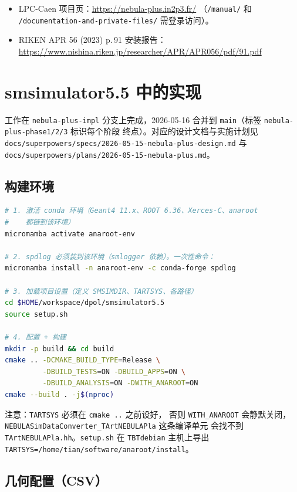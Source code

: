 \documentclass[a4paper,11pt]{ctexart}
\begin{document}
\begin{itemize}
  \item LPC-Caen 项目页：\url{https://nebula-plus.in2p3.fr/}
        （\texttt{/manual/} 和 \texttt{/documentation-and-private-files/}
        需登录访问）。
  \item RIKEN APR 56 (2023) p.\,91 安装报告：
        \url{https://www.nishina.riken.jp/researcher/APR/APR056/pdf/91.pdf}
\end{itemize}

\section{smsimulator5.5 中的实现}
\label{sec:impl}

工作在 \texttt{nebula-plus-impl} 分支上完成，2026-05-16 合并到
\texttt{main}（标签 \texttt{nebula-plus-phase1/2/3} 标识每个阶段
终点）。对应的设计文档与实施计划见
\texttt{docs/superpowers/specs/2026-05-15-nebula-plus-design.md}
与
\texttt{docs/superpowers/plans/2026-05-15-nebula-plus.md}。

\subsection{构建环境}

\begin{lstlisting}[language=bash]
# 1. 激活 conda 环境（Geant4 11.x、ROOT 6.36、Xerces-C、anaroot
#    都链到该环境）
micromamba activate anaroot-env

# 2. spdlog 必须装到该环境（smlogger 依赖）。一次性命令：
micromamba install -n anaroot-env -c conda-forge spdlog

# 3. 加载项目设置（定义 SMSIMDIR、TARTSYS、各路径）
cd $HOME/workspace/dpol/smsimulator5.5
source setup.sh

# 4. 配置 + 构建
mkdir -p build && cd build
cmake .. -DCMAKE_BUILD_TYPE=Release \
         -DBUILD_TESTS=ON -DBUILD_APPS=ON \
         -DBUILD_ANALYSIS=ON -DWITH_ANAROOT=ON
cmake --build . -j$(nproc)
\end{lstlisting}

注意：\texttt{TARTSYS} 必须在 \texttt{cmake ..} 之前设好，
否则 \texttt{WITH\_ANAROOT} 会静默关闭，
\texttt{NEBULASimDataConverter\_TArtNEBULAPla} 这条编译单元
会找不到 \texttt{TArtNEBULAPla.hh}。\texttt{setup.sh} 在
\texttt{TBTdebian} 主机上导出 \texttt{TARTSYS=/home/tian/software/anaroot/install}。

\subsection{几何配置（CSV）}
\end{document}
